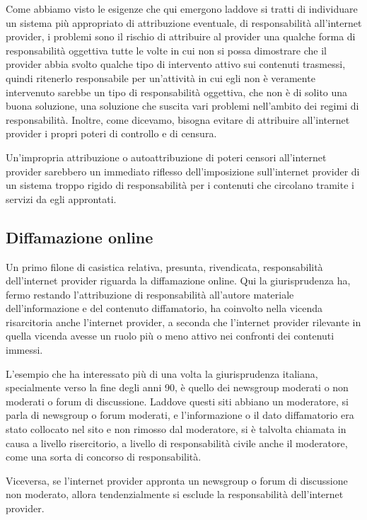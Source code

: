 Come abbiamo visto le esigenze che qui emergono laddove si tratti di individuare un sistema più appropriato di attribuzione eventuale, di responsabilità all'internet provider, i problemi sono il rischio di attribuire al provider una qualche forma di responsabilità oggettiva tutte le volte in cui non si possa dimostrare che il provider abbia svolto qualche tipo di intervento attivo sui contenuti trasmessi, quindi ritenerlo responsabile per un'attività in cui egli non è veramente intervenuto sarebbe un tipo di responsabilità oggettiva, che non è di solito una buona soluzione, una soluzione che suscita vari problemi nell'ambito dei regimi di responsabilità. Inoltre, come dicevamo, bisogna evitare di attribuire all'internet provider i propri poteri di controllo e di censura. 

Un'impropria attribuzione o autoattribuzione di poteri censori all'internet provider sarebbero un immediato riflesso dell'imposizione sull'internet provider di un sistema troppo rigido di responsabilità per i contenuti che circolano tramite i servizi da egli approntati. 

\subsection{Diffamazione online}

Un primo filone di casistica relativa, presunta, rivendicata, responsabilità dell'internet provider riguarda la diffamazione online. Qui la giurisprudenza ha, fermo restando l'attribuzione di responsabilità all'autore materiale dell'informazione e del contenuto diffamatorio, ha coinvolto nella vicenda risarcitoria anche l'internet provider, a seconda che l'internet provider rilevante in quella vicenda avesse un ruolo più o meno attivo nei confronti dei contenuti immessi. 

L'esempio che ha interessato più di una volta la giurisprudenza italiana, specialmente verso la fine degli anni 90, è quello dei newsgroup moderati o non moderati o forum di discussione. Laddove questi siti abbiano un moderatore, si parla di newsgroup o forum moderati, e l'informazione o il dato diffamatorio era stato collocato nel sito e non rimosso dal moderatore, si è talvolta chiamata in causa a livello risercitorio, a livello di responsabilità civile anche il moderatore, come una sorta di concorso di responsabilità.

Viceversa, se l'internet provider appronta un newsgroup o forum di discussione non moderato, allora tendenzialmente si esclude la responsabilità dell'internet provider. 

